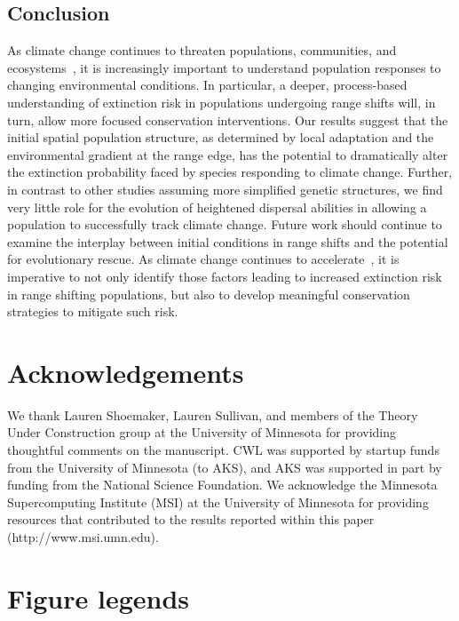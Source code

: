 \documentclass[12pt, oneside]{article}
\begin{document}
\subsection*{Conclusion}
As climate change continues to threaten populations, communities, and ecosystems~\citep{chen2011rapid, hobbs2009novel, gonzalez2010global}, it is increasingly important to understand population responses to changing environmental conditions. In particular, a deeper, process-based understanding of extinction risk in populations undergoing range shifts will, in turn, allow more focused conservation interventions. Our results suggest that the initial spatial population structure, as determined by local adaptation and the environmental gradient at the range edge, has the potential to dramatically alter the extinction probability faced by species responding to climate change. Further, in contrast to other studies assuming more simplified genetic structures, we find very little role for the evolution of heightened dispersal abilities in allowing a population to successfully track climate change. Future work should continue to examine the interplay between initial conditions in range shifts and the potential for evolutionary rescue. As climate change continues to accelerate~\citep{chen2017increasing}, it is imperative to not only identify those factors leading to increased extinction risk in range shifting populations, but also to develop meaningful conservation strategies to mitigate such risk.

\section*{Acknowledgements}
We thank Lauren Shoemaker, Lauren Sullivan, and members of the Theory Under Construction group at the University of Minnesota for providing thoughtful comments on the manuscript. CWL was supported by startup funds from the University of Minnesota (to AKS), and AKS was supported in part by funding from the National Science Foundation. We acknowledge the Minnesota Supercomputing Institute (MSI) at the University of Minnesota for providing resources that contributed to the results reported within this paper (http://www.msi.umn.edu).




\newpage

\section*{Figure legends}
\end{document}
